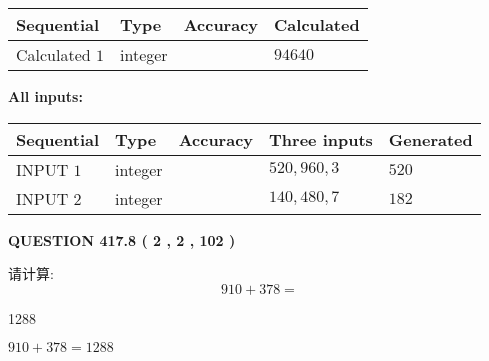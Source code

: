 \documentclass{ctexart}
\begin{document}
   
  
  
\noindent\begin{tabular}{|l|l|l|l|}
\hline
 Sequential & Type & Accuracy & Calculated \\ 
\hline
 
 
  Calculated $  1 $ & integer &  & 
  $ 94640 $ 
 \\  \hline  
 \end{tabular}
   
   
   
   
\noindent\vspace{0.1in}\hspace{-0.08in} {\textbf{\Large{All inputs: }}}
   
   
  
  
\noindent\begin{tabular}{|l|l|l|l|l|}
\hline
 Sequential & Type & Accuracy & Three inputs & Generated \\ 
\hline
 
 
  INPUT $  1 $ & integer &  & $
 520
 , 
 960
 , 
 3
 $ & $ 520 $ 
 \\  \hline  
 
 
  INPUT $  2 $ & integer &  & $
 140
 , 
 480
 , 
 7
 $ & $ 182 $ 
 \\  \hline  
 \end{tabular}
   
   
  
\vspace{0.2in}
  
{\textbf{\Large{QUESTION
417.8 
 ( 2 , 2 , 102 )
}}}
  
  
 
请计算:
\begin{equation}
910 +  %
378 = \nonumber
\end{equation}
 
 
 
\noindent{}
 
 

1288
 
 
\noindent{}
 
 

 
 
 
\noindent{}
 
 

$ %
910 +  %
378=   %
1288$
 
\end{document}
